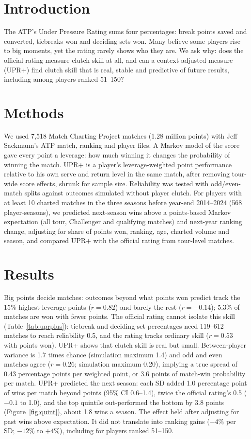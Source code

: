 \section*{Introduction}
The ATP's Under Pressure Rating sums four percentages: break points saved and converted, tiebreaks won and deciding sets won. Many believe some players rise to big moments, yet the rating rarely shows who they are. We ask why: does the official rating measure clutch skill at all, and can a context-adjusted measure (UPR+) find clutch skill that is real, stable and predictive of future results, including among players ranked 51--150?

\section*{Methods}
We used 7,518 Match Charting Project matches (1.28 million points) with Jeff Sackmann's ATP match, ranking and player files. A Markov model of the score gave every point a leverage: how much winning it changes the probability of winning the match. UPR+ is a player's leverage-weighted point performance relative to his own serve and return level in the same match, after removing tour-wide score effects, shrunk for sample size. Reliability was tested with odd/even-match splits against outcomes simulated without player clutch. For players with at least 10 charted matches in the three seasons before year-end 2014--2024 (568 player-seasons), we predicted next-season wins above a points-based Markov expectation (all tour, Challenger and qualifying matches) and next-year ranking change, adjusting for share of points won, ranking, age, charted volume and season, and compared UPR+ with the official rating from tour-level matches.

\section*{Results}
Big points decide matches: outcomes beyond what points won predict track the 15\% highest-leverage points ($r = 0.82$) and barely the rest ($r = -0.14$); 5.3\% of matches are won with fewer points. The official rating cannot isolate this skill (Table~\ref{tab:uprplus}): tiebreak and deciding-set percentages need 119--612 matches to reach reliability 0.5, and the rating tracks ordinary skill ($r = 0.53$ with points won). UPR+ shows that clutch skill is real but small. Between-player variance is 1.7 times chance (simulation maximum 1.4) and odd and even matches agree ($r = 0.26$; simulation maximum 0.20), implying a true spread of 0.43 percentage points per weighted point, or 3.6 points of match-win probability per match. UPR+ predicted the next season: each SD added 1.0 percentage point of wins per match beyond points (95\% CI 0.6--1.4), twice the official rating's 0.5 ($-0.1$ to 1.0), and the top quintile out-performed the bottom by 3.8 points (Figure~\ref{fig:quint}), about 1.8 wins a season. The effect held after adjusting for past wins above expectation. It did not translate into ranking gains ($-4\%$ per SD; $-12\%$ to $+4\%$), including for players ranked 51--150.

